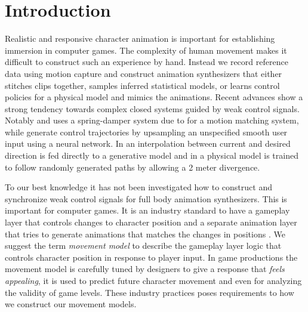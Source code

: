 \section{Introduction}
Realistic and responsive character animation is important for establishing immersion in computer games. The complexity of human movement makes it difficult to construct such an experience by hand. Instead we record reference data using motion capture and construct animation synthesizers that either stitches clips together, samples inferred statistical models, or learns control policies for a physical model and mimics the animations. Recent advances 
show a strong tendency towards complex closed systems guided by weak control signals. Notably \citep{holden.ea20} and \citep{Bergamin19} uses a spring-damper system due to \citep{kermse.04} for a motion matching system, while \citep{startke20} generate control trajectories by upsampling an unspecified smooth user input using a neural network. In \citep{zhang18} an interpolation between current and desired direction is fed directly to a generative model and in \citep{peng17} a physical model is trained to follow randomly generated paths by allowing a 2 meter divergence. 

To our best knowledge it has not been investigated how to construct and synchronize weak control signals for full body  animation synthesizers. This is important for computer games. It is an  industry standard to have a gameplay layer that controls changes to character position and a separate animation layer that tries to generate animations that matches the changes in positions \citep{holden18}. We suggest the term \textit{movement model} to describe the gameplay layer logic that controls character position in response to player input. In game productions the movement model is carefully tuned by designers to give a response that \textit{feels appealing}, it is used to predict future character movement and even for analyzing the validity of game levels. These industry practices poses requirements to how we construct our movement models. 

